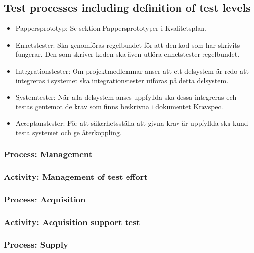 \documentclass[a4paper,10pt]{article}
\begin{document}
\subsection{Test processes including definition of test levels}
\begin{itemize}
	\item Pappersprototyp: Se sektion Pappersprototyper i Kvalitetsplan.
	\item Enhetstester: Ska genomföras regelbundet för att den kod som har skrivits fungerar. Den som skriver koden ska även utföra enhetstester regelbundet.
	\item Integrationstester: Om projektmedlemmar anser att ett delsystem är redo att integreras i systemet ska integrationstester utföras på detta delsystem.
	\item Systemtester: När alla delsystem anses uppfyllda ska dessa integreras och testas gentemot de krav som finns beskrivna i dokumentet Kravspec.
	\item Acceptanstester: För att säkerhetsställa att givna krav är uppfyllda ska kund testa systemet och ge återkoppling.
\end{itemize}

\subsubsection{Process: Management}
\subsubsection{Activity: Management of test effort}
\subsubsection{Process: Acquisition}
\subsubsection{Activity: Acquisition support test}
\subsubsection{Process: Supply}
\end{document}

